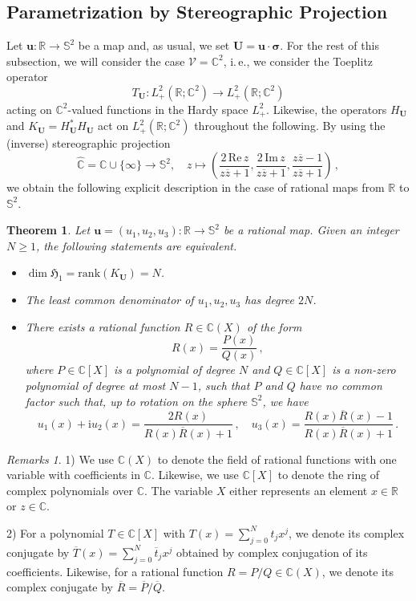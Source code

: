 \documentclass[11pt,reqno]{amsart}
\newtheorem{thm}{Theorem}[section]
\theoremstyle{definition}
\theoremstyle{remark}
\theoremstyle{remark}
\newtheorem*{remarks*}{Remarks}
\numberwithin{equation}{section}
\newcommand{\Hfr}{\mathfrak{H}}
\newcommand{\C}{\mathbb{C}}
\newcommand{\R}{\mathbb{R}}
\newcommand{\Ss}{\mathbb{S}}
\newcommand{\VV}{\mathcal{V}}
\newcommand{\ov}{\overline}
\newcommand{\rank}{\mathrm{rank}}
\newcommand{\ii}{\mathrm{i}}
\newcommand{\uu}{\mathbf{u}}
\newcommand{\Ub}{\mathbf{U}}
\begin{document}
\subsection*{Parametrization  by Stereographic Projection}

Let $\uu : \R \to \Ss^2$ be a map and, as usual, we set $\Ub = \uu \cdot \bm{\sigma}$. For the rest of this subsection, we will consider the case $\VV=\C^2$, i.\,e., we consider the Toeplitz operator
$$
T_\Ub : L^2_+(\R; \C^2) \to L^2_+(\R; \C^2)
$$
acting on $\C^2$-valued functions in the Hardy space $L^2_+$. Likewise, the operators $H_{\Ub}$ and $K_{\Ub} = H_{\Ub}^* H_{\Ub}$ act on $L^2_+(\R; \C^2)$ throughout the following. By using the (inverse) stereographic projection 
$$
\hat{\C} = \C \cup \{ \infty \} \to \Ss^2, \quad z \mapsto \left ( \frac{2 \, \mathrm{Re} \, z}{z \ov{z} + 1}, \frac{2 \, \mathrm{Im} \, z}{z \ov{z} + 1}, \frac{z \ov{z}-1}{z \ov{z} + 1} \right ) \, ,
$$
we obtain the following explicit description in the case of rational maps from $\R$ to $\Ss^2$.
 
\begin{thm} \label{thm:toeplitz_stereo}
Let $\uu =(u_1, u_2, u_3) : \R \to \Ss^2$ be a rational map. Given an integer $N \geq 1$, the following statements are equivalent.
\begin{itemize}
\item[(i)] $\dim \Hfr_1 = \rank(K_{\Ub}) = N$.
\item[(ii)] The least common denominator of $u_1, u_2, u_3$ has degree $2N$.
\item[(iii)] There exists a rational function $R \in \C(X)$ of the form
$$
R(x) = \frac{P(x)}{Q(x)} \, ,
$$
where $P \in \C[X]$ is a polynomial of degree $N$ and $Q \in \C[X]$ is a non-zero polynomial of degree at most $N-1$, such that $P$ and $Q$ have no common factor such that, up to rotation on the sphere $\Ss^2$, we have
$$
u_1(x) + \ii u_2(x) = \frac{2 R(x)}{R(x) \ov{R}(x)+1} \, , \quad u_3(x) = \frac{R(x) \ov{R}(x) -1}{R(x) \ov{R}(x) + 1} \, .
$$
\end{itemize}
\end{thm}  

\begin{remarks*}
1) We use $\C(X)$ to denote the field of rational functions with one variable with coefficients in $\C$. Likewise, we use $\C[X]$ to denote the ring of complex polynomials over $\C$. The variable $X$ either represents an element $x \in \R$ or $z \in \C$. 

2) For a polynomial $T \in \C[X]$ with $T(x) = \sum_{j=0}^N t_j x^j$, we denote its complex conjugate by $\ov{T}(x) = \sum_{j=0}^N \ov{t}_j x^j$ obtained by complex conjugation of its coefficients. Likewise, for a rational function $R = P/Q \in \C(X)$, we denote its complex conjugate by $\ov{R}= \ov{P}/\ov{Q}$.
\end{remarks*}
\end{document}
